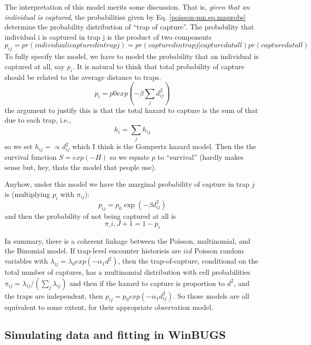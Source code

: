 
The interpretation of this model merits some discussion. That is, 
{\it given that an individual is captured}, the probabilities given by
Eq. \ref{poisson-mn.eq.mnprobs} determine 
the probability distribution of ``trap of capture''. 
The probability that individual i is captured in trap j is the product of two components
\[
p_{ij} = pr(individual i captured in trap j) = 
 pr(captured in trap j | captured at all)pr(captured at all)
\]
To fully specify the model, we have to
model the probability that an individual is captured at all, say $p_i$.
It is natural to think that total probability of capture should be related
to the average distance to traps. 
\[
 p_{i} = p0 exp(-\beta \sum_{j} d_{ij}^2)
\]
the argument to justify this is that the total hazard to capture
is the sum of that due to each trap, i.e.,
\[
 h_{i} = \sum_{j} h_{ij}
\]
so we set $h_{ij} = \propto d_{ij}^{2}$ which I think is the Gompertz hazard model.  Then
the the survival function $S=exp(-H)$ so we equate $p$ to ``survival'' (hardly makes sense
but, hey, thats the model that people use). 

Anyhow, under this model we have the marginal probability of capture in trap $j$ is
(multiplying $p_{i}$ with $\pi_{ij}$):
\[
 p_{ij} =   p_{0}  \exp(-\beta d_{ij}^2)
\]
and then the probability of not being captured at all is 
\[
 \pi\_{i,J+1} =  1-p_i 
\]


In summary, there is a coherent linkage between the Poisson, multinomial, and the Binomial
model. If trap-level encounter historieis are $iid$ Poisson random variables with 
$\lambda_{ij} = \lambda_{0}exp(-\alpha_{1} d^{2})$, then
the trap-of-capture, conditional on the total number of captures,
 has a multinomial distribution with cell probabilities 
 $\pi_{ij} = \lambda_{ij}/(\sum_{j} \lambda_{ij})$ and then if the hazard
 to capture is proportion to $d^{2}$, and the traps are independent, 
then $p_{ij} = p_{0} exp(-\alpha_{1} d_{ij}^{2})$.  So those models are all equivalent to
some extent, for their appropriate observation model. 



\subsection{Simulating data and fitting in WinBUGS}

